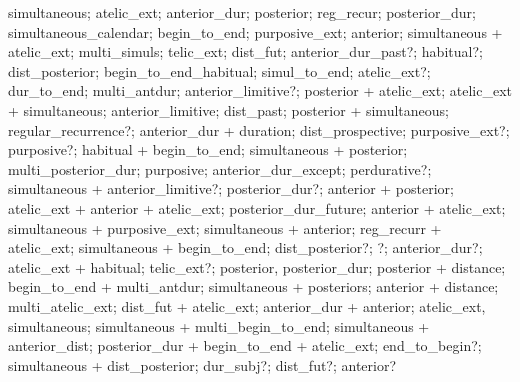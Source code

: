 simultaneous; atelic\_ext; anterior\_dur; posterior; reg\_recur; posterior\_dur; simultaneous\_calendar; begin\_to\_end; purposive\_ext; anterior; simultaneous + atelic\_ext; multi\_simuls; telic\_ext; dist\_fut; anterior\_dur\_past?; habitual?; dist\_posterior; begin\_to\_end\_habitual; simul\_to\_end; atelic\_ext?; dur\_to\_end; multi\_antdur; anterior\_limitive?; posterior + atelic\_ext; atelic\_ext + simultaneous; anterior\_limitive; dist\_past; posterior + simultaneous; regular\_recurrence?; anterior\_dur + duration; dist\_prospective; purposive\_ext?; purposive?; habitual + begin\_to\_end; simultaneous + posterior; multi\_posterior\_dur; purposive; anterior\_dur\_except; perdurative?; simultaneous + anterior\_limitive?; posterior\_dur?; anterior + posterior; atelic\_ext + anterior + atelic\_ext; posterior\_dur\_future; anterior + atelic\_ext; simultaneous + purposive\_ext; simultaneous + anterior; reg\_recurr + atelic\_ext; simultaneous + begin\_to\_end; dist\_posterior?; ?; anterior\_dur?; atelic\_ext + habitual; telic\_ext?; posterior, posterior\_dur; posterior + distance; begin\_to\_end + multi\_antdur; simultaneous + posteriors; anterior + distance; multi\_atelic\_ext; dist\_fut + atelic\_ext; anterior\_dur + anterior; atelic\_ext, simultaneous; simultaneous + multi\_begin\_to\_end; simultaneous + anterior\_dist; posterior\_dur + begin\_to\_end + atelic\_ext; end\_to\_begin?; simultaneous + dist\_posterior; dur\_subj?; dist\_fut?; anterior?%